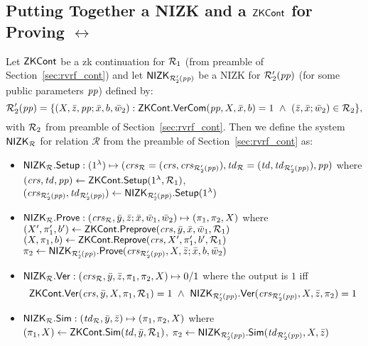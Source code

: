 \subsection{Putting Together a NIZK and a $\ZKCont$  for Proving $\rel$} \label{sec:nizkR}
Let $\ZKCont$ be a zk continuation for $\relone$ (from preamble of Section~\ref{sec:rvrf_cont}) and 
let $\nizktwo$ be a NIZK for $\reltwo'(\pp)$ (for some public parameters $\pp$) defined by:
$$\reltwo'(\pp) = \{(X, \barz, \pp; \barx, b, \baromega_2): \ZKCont.\VerifyCom(\pp, X, \barx, b) =1 \ \wedge \ (\barz, \barx; \baromega_2) \in \reltwo \},$$
\noindent with $\reltwo$ from preamble of Section~\ref{sec:rvrf_cont}. Then we define the system $\nizkR$ for relation $\mathcal{R}$ 
from the preamble of Section~\ref{sec:rvrf_cont} as:
\begin{itemize}
\item $\nizkR.\Setup: (1^{\lambda}) \mapsto (\crsR = (\crs,\crstwo), \twR = (\tw, \twtwo), \pp)$ where
$(\crs, \tw, \pp) \leftarrow \ZKCont.\Setup(1^{\lambda}, \relone)$, \\ $(\crstwo, \twtwo) \leftarrow \nizktwo.\Setup(1^{\lambda})$


\item $\nizkR.\Prove: (\crsR,\bary, \barz; \barx, \baromega_1, \baromega_2 ) \mapsto (\pi_1, \pi_2, X)$ where \\
$(X', \pi'_1, b')\leftarrow \ZKCont.\Preprove(\crs, \bar{y}, \bar{x}, \baromega_1, \relone)$ \\
$(X, \pi_1, b) \leftarrow \ZKCont.\Reprove(\crs, X', \pi_1', b', \relone)$ \\
$ \pi_2 \leftarrow \nizktwo.\Prove(\crstwo, X, \barz; \barx, b, \baromega_2)$ 

\item $\nizkR.\Verify: (\crsR,\bary, \barz, \pi_1, \pi_2, X) \mapsto 0/1$ where the output is $1$ iff 
$$\ZKCont.\Verify(\crs, \bar{y}, X, \pi_1, \relone) = 1 \  \wedge \ \nizktwo.\Verify(\crstwo, X, \barz, \pi_2) =1$$

\item $\nizkR.\Sim: (\twR, \bary, \barz) \mapsto (\pi_1, \pi_2, X)$ where \\
$(\pi_1, X) \leftarrow \ZKCont.\Sim(\tw, \bary, \relone)$, $\pi_2 \leftarrow \nizktwo.\Sim(\twtwo, X, \barz)$ 
 \end{itemize}
 
